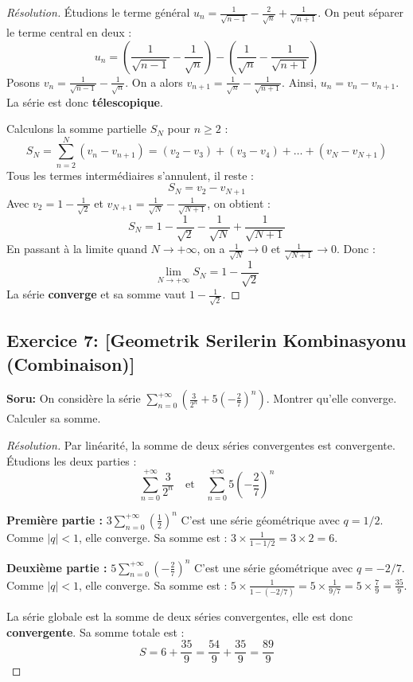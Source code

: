 \documentclass[12pt,a4paper]{report}
\begin{document}
\begin{proof}[Résolution]
Étudions le terme général $u_n = \frac{1}{\sqrt{n-1}} - \frac{2}{\sqrt{n}} + \frac{1}{\sqrt{n+1}}$.
On peut séparer le terme central en deux :
\[ u_n = \left( \frac{1}{\sqrt{n-1}} - \frac{1}{\sqrt{n}} \right) - \left( \frac{1}{\sqrt{n}} - \frac{1}{\sqrt{n+1}} \right) \]
Posons $v_n = \frac{1}{\sqrt{n-1}} - \frac{1}{\sqrt{n}}$. On a alors $v_{n+1} = \frac{1}{\sqrt{n}} - \frac{1}{\sqrt{n+1}}$.
Ainsi, $u_n = v_n - v_{n+1}$. La série est donc \textbf{télescopique}.

Calculons la somme partielle $S_N$ pour $n \ge 2$ :
\[ S_N = \sum_{n=2}^N (v_n - v_{n+1}) = (v_2 - v_3) + (v_3 - v_4) + \dots + (v_N - v_{N+1}) \]
Tous les termes intermédiaires s'annulent, il reste :
\[ S_N = v_2 - v_{N+1} \]
Avec $v_2 = 1 - \frac{1}{\sqrt{2}}$ et $v_{N+1} = \frac{1}{\sqrt{N}} - \frac{1}{\sqrt{N+1}}$, on obtient :
\[ S_N = 1 - \frac{1}{\sqrt{2}} - \frac{1}{\sqrt{N}} + \frac{1}{\sqrt{N+1}} \]
En passant à la limite quand $N \to +\infty$, on a $\frac{1}{\sqrt{N}} \to 0$ et $\frac{1}{\sqrt{N+1}} \to 0$.
Donc :
\[ \lim_{N \to +\infty} S_N = 1 - \frac{1}{\sqrt{2}} \]
La série \textbf{converge} et sa somme vaut $1 - \frac{1}{\sqrt{2}}$.
\end{proof}

\subsection*{Exercice 7: [Geometrik Serilerin Kombinasyonu (Combinaison)]}

\textbf{Soru:}
On considère la série $\sum_{n=0}^{+\infty} \left( \frac{3}{2^n} + 5 \left(-\frac{2}{7}\right)^n \right)$.
Montrer qu'elle converge. Calculer sa somme.

\begin{proof}[Résolution]
Par linéarité, la somme de deux séries convergentes est convergente. Étudions les deux parties :
\[ \sum_{n=0}^{+\infty} \frac{3}{2^n} \quad \text{et} \quad \sum_{n=0}^{+\infty} 5 \left(-\frac{2}{7}\right)^n \]

\textbf{Première partie :} $3 \sum_{n=0}^{+\infty} \left(\frac{1}{2}\right)^n$
C'est une série géométrique avec $q = 1/2$. Comme $|q| < 1$, elle converge.
Sa somme est : $3 \times \frac{1}{1 - 1/2} = 3 \times 2 = 6$.

\textbf{Deuxième partie :} $5 \sum_{n=0}^{+\infty} \left(-\frac{2}{7}\right)^n$
C'est une série géométrique avec $q = -2/7$. Comme $|q| < 1$, elle converge.
Sa somme est : $5 \times \frac{1}{1 - (-2/7)} = 5 \times \frac{1}{9/7} = 5 \times \frac{7}{9} = \frac{35}{9}$.

La série globale est la somme de deux séries convergentes, elle est donc \textbf{convergente}.
Sa somme totale est :
\[ S = 6 + \frac{35}{9} = \frac{54}{9} + \frac{35}{9} = \frac{89}{9} \]
\end{proof}
\end{document}
